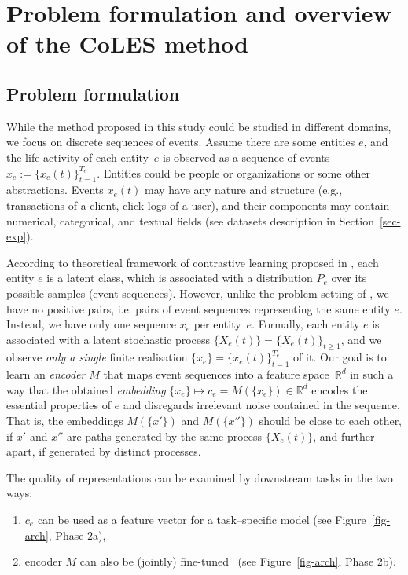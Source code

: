 \documentclass[sigconf, anonymous]{acmart}
\newcommand{\R}{\mathbb{R}}
\begin{document}
\section{Problem formulation and overview of the CoLES method} \label{sec-method}

\subsection{Problem formulation} \label{sec:problem setting}

While the method proposed in this study could be studied in different domains, we focus on discrete
sequences of events. Assume there are some entities $e$, and the life activity of each entity~$e$ is
observed as a sequence of events $
    x_e := \{x_e(t)\}^{T_e}_{t=1}
$. Entities could be people or organizations or some other abstractions. Events $x_e(t)$ may have
any nature and structure (e.g., transactions of a client, click logs of a user), and their components
may contain numerical, categorical, and textual fields (see datasets description in Section~\ref{sec-exp}). 

According to theoretical framework of contrastive learning proposed in \citep{Saunshi2019ICML}, each
entity $e$ is a latent class, which is associated with a distribution $P_e$ over its possible samples
(event sequences). However, unlike the problem setting of \cite{Saunshi2019ICML}, we have no positive
pairs, i.e. pairs of event sequences representing the same entity $e$. Instead, we have only one
sequence $x_e$ per entity~$e$. Formally, each entity $e$ is associated with a latent stochastic
process $
    \{X_e(t)\} = \{X_e(t)\}_{t\geq 1}
$, and we observe \emph{only a single} finite realisation $
    \{x_e\} = \{x_e(t)\}_{t=1}^{T_e}
$ of it. Our goal is to learn an \emph{encoder} $M$ that maps event sequences into a feature space~$\R^d$
in such a way that the obtained \emph{embedding} $
    \{x_e\} \mapsto c_e = M(\{x_e\}) \in \R^d
$ encodes the essential properties of $e$ and disregards irrelevant noise contained in the sequence.
That is, the embeddings $M(\{x'\})$ and $M(\{x''\})$ should be close to each other, if $x'$ and
$x''$ are paths generated by the same process $\{X_e(t)\}$, and further apart, if generated by distinct
processes.

The quality of representations can be examined by downstream tasks in the two ways:
\begin{enumerate}
    \item $c_e$ can be used as a feature vector for a task--specific model (see Figure~\ref{fig-arch}, Phase 2a),
    \item encoder $M$ can also be (jointly) fine-tuned~\citep{Yosinski2014HowTA} (see Figure~\ref{fig-arch}, Phase 2b).
\end{enumerate}
\end{document}
